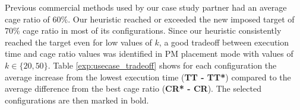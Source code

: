 Previous commercial methods used by our case study partner had an average cage ratio of $60\%$.
Our heuristic reached or exceeded the new imposed target of $70\%$ cage ratio in most of its configurations.
Since our heuristic consistently reached the target even for low values of $k$, a good tradeoff between execution time and cage ratio values was identified in PM placement mode with values of $k \in \{ 20, 50 \}$.
Table \ref{exp:usecase_tradeoff} shows for each configuration the average increase from the lowest execution time (\textbf{TT - TT*}) compared to the average difference from the best cage ratio (\textbf{CR* - CR}).
The selected configurations are then marked in bold.
\label{exp:usecase_results}


